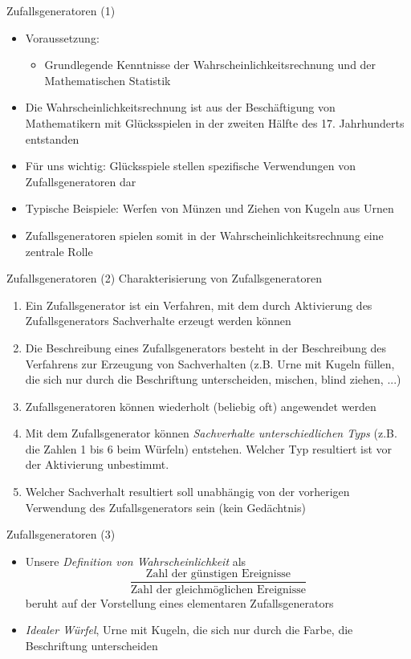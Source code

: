 \documentclass[9pt]{beamer}
\begin{document}
\begin{frame}{Zufallsgeneratoren (1)}
\begin{itemize}
\item Voraussetzung:
    \begin{itemize}
    \item Grundlegende Kenntnisse der Wahrscheinlichkeitsrechnung und der Mathematischen Statistik
    \end{itemize}
\item Die Wahrscheinlichkeitsrechnung ist aus der Besch\"{a}ftigung von Mathematikern mit Gl\"{u}cksspielen in der zweiten H\"{a}lfte des 17. Jahrhunderts entstanden
\item F\"{u}r uns wichtig: Gl\"{u}cksspiele stellen spezifische Verwendungen von Zufallsgeneratoren dar
\item Typische Beispiele: Werfen von M\"{u}nzen und Ziehen von Kugeln aus Urnen
\item Zufallsgeneratoren spielen somit in der Wahrscheinlichkeitsrechnung eine zentrale Rolle
\end{itemize}
\end{frame}

\begin{frame}{Zufallsgeneratoren (2)}
Charakterisierung von Zufallsgeneratoren
\begin{enumerate}
  \item Ein Zufallsgenerator ist ein Verfahren, mit dem durch Aktivierung des Zufallsgenerators Sachverhalte erzeugt werden k\"{o}nnen
  \item Die Beschreibung eines Zufallsgenerators besteht in der Beschreibung des Verfahrens zur Erzeugung von Sachverhalten (z.B. Urne mit Kugeln f\"{u}llen, die sich nur durch die Beschriftung unterscheiden, mischen, blind ziehen, ...)
  \item Zufallsgeneratoren k\"{o}nnen wiederholt (beliebig oft) angewendet werden
  \item Mit dem Zufallsgenerator k\"{o}nnen \emph{Sachverhalte unterschiedlichen Typs} (z.B. die Zahlen 1 bis 6 beim W\"{u}rfeln) entstehen. Welcher Typ resultiert ist vor der Aktivierung unbestimmt.
  \item Welcher Sachverhalt resultiert soll unabh\"{a}ngig von der vorherigen Verwendung des Zufallsgenerators sein (kein Ged\"{a}chtnis)
\end{enumerate}
\end{frame}

\begin{frame}{Zufallsgeneratoren (3)}
\begin{itemize}
  \item Unsere \emph{Definition von Wahrscheinlichkeit} als
$$ \frac{\text{Zahl der g\"{u}nstigen Ereignisse}}{\text{Zahl der gleichm\"{o}glichen Ereignisse}}$$
beruht auf der Vorstellung eines elementaren Zufallsgenerators
\item \emph{Idealer W\"{u}rfel}, Urne mit Kugeln, die sich nur durch die Farbe, die Beschriftung unterscheiden
\end{itemize}
\end{frame}
\end{document}
